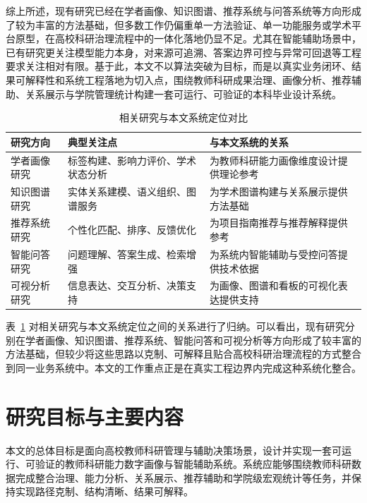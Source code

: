\documentclass[12pt,a4paper]{ctexbook}
\begin{document}
综上所述，现有研究已经在学者画像、知识图谱、推荐系统与问答系统等方向形成了较为丰富的方法基础，但多数工作仍偏重单一方法验证、单一功能服务或学术平台原型，在高校科研治理流程中的一体化落地仍显不足。尤其在智能辅助场景中，已有研究更关注模型能力本身，对来源可追溯、答案边界可控与异常可回退等工程要求关注相对有限。基于此，本文不以算法突破为目标，而是以真实业务闭环、结果可解释性和系统工程落地为切入点，围绕教师科研成果治理、画像分析、推荐辅助、关系展示与学院管理统计构建一套可运行、可验证的本科毕业设计系统。

\begin{table}[H]
  \centering
  \caption{相关研究与本文系统定位对比}
  \label{tab:related-work-compare}
  \begin{tabular}{p{3.2cm}p{4.2cm}p{5.2cm}}
    \toprule
    研究方向 & 典型关注点 & 与本文系统的关系 \\
    \midrule
    学者画像研究 & 标签构建、影响力评价、学术状态分析 & 为教师科研能力画像维度设计提供理论参考 \\
    知识图谱研究 & 实体关系建模、语义组织、图谱服务 & 为学术图谱构建与关系展示提供方法基础 \\
    推荐系统研究 & 个性化匹配、排序、反馈优化 & 为项目指南推荐与推荐解释提供参考 \\
    智能问答研究 & 问题理解、答案生成、检索增强 & 为系统内智能辅助与受控问答提供技术依据 \\
    可视分析研究 & 信息表达、交互分析、决策支持 & 为画像、图谱和看板的可视化表达提供支持 \\
    \bottomrule
  \end{tabular}
\end{table}

表~\ref{tab:related-work-compare} 对相关研究与本文系统定位之间的关系进行了归纳。可以看出，现有研究分别在学者画像、知识图谱、推荐系统、智能问答和可视分析等方向形成了较丰富的方法基础，但较少将这些思路以克制、可解释且贴合高校科研治理流程的方式整合到同一业务系统中。本文的工作重点正是在真实工程边界内完成这种系统化整合。

\section{研究目标与主要内容}
本文的总体目标是面向高校教师科研管理与辅助决策场景，设计并实现一套可运行、可验证的教师科研能力数字画像与智能辅助系统。系统应能够围绕教师科研数据完成整合治理、能力分析、关系展示、推荐辅助和学院级宏观统计等任务，并保持实现路径克制、结构清晰、结果可解释。
\end{document}
